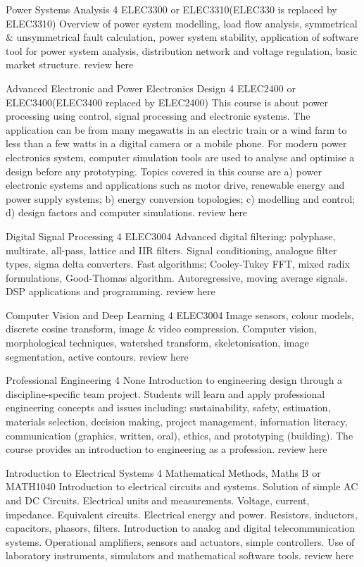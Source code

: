 	{Power Systems Analysis}
	{4}
	{ELEC3300 or ELEC3310(ELEC330 is replaced by ELEC3310)}
	{}
	{}
	{Overview of power system modelling, load flow analysis, symmetrical & unsymmetrical fault calculation, power system stability, application of software tool for power system analysis, distribution network and voltage regulation, basic market structure.}
	{review here}

	{Advanced Electronic and Power Electronics Design}
	{4}
	{ELEC2400 or ELEC3400(ELEC3400 replaced by ELEC2400)}
	{}
	{}
	{This course is about power processing using control, signal processing and electronic systems. The application can be from many megawatts in an electric train or a wind farm to less than a few watts in a digital camera or a mobile phone. For modern power electronics system, computer simulation tools are used to analyse and optimise a design before any prototyping. Topics covered in this course are a) power electronic systems and applications such as motor drive, renewable energy and power supply systems; b) energy conversion topologies; c) modelling and control; d) design factors and computer simulations.}
	{review here}

	{Digital Signal Processing}
	{4}
	{ELEC3004}
	{}
	{}
	{Advanced digital filtering: polyphase, multirate, all-pass, lattice and IIR filters. Signal conditioning, analogue filter types, sigma delta converters. Fast algorithms; Cooley-Tukey FFT, mixed radix formulations, Good-Thomas algorithm. Autoregressive, moving average signals. DSP applications and programming.}
	{review here}

	{Computer Vision and Deep Learning}
	{4}
	{ELEC3004}
	{}
	{}
	{Image sensors, colour models, discrete cosine transform, image & video compression. Computer vision, morphological techniques, watershed transform, skeletonisation, image segmentation, active contours.}
	{review here}

	{Professional Engineering}
	{4}
	{None}
	{}
	{}
	{Introduction to engineering design through a discipline-specific team project. Students will learn and apply professional engineering concepts and issues including: sustainability, safety, estimation, materials selection, decision making, project management, information literacy, communication (graphics, written, oral), ethics, and prototyping (building). The course provides an introduction to engineering as a profession.}
	{review here}

	{Introduction to Electrical Systems}
	{4}
	{Mathematical Methods, Maths B or MATH1040}
	{}
	{}
	{Introduction to electrical circuits and systems. Solution of simple AC and DC Circuits. Electrical units and measurements. Voltage, current, impedance. Equivalent circuits. Electrical energy and power. Resistors, inductors, capacitors, phasors, filters. Introduction to analog and digital telecommunication systems. Operational amplifiers, sensors and actuators, simple controllers. Use of laboratory instruments, simulators and mathematical software tools.}
	{review here}

